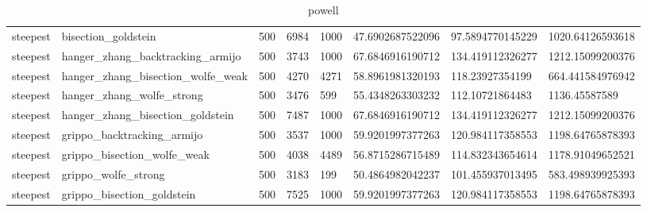 \documentclass[a4paper,11pt]{article}
\numberwithin{equation}{section} %
\begin{document}
\begin{table}[h!]
{\begin{tabular}{|l|l|l|l|l|l|l|l|}
        steepest & bisection\_goldstein & 500 & 6984 & 1000 & 47.6902687522096 & 97.5894770145229 & 1020.64126593618 \\
        steepest & hanger\_zhang\_backtracking\_armijo & 500 & 3743 & 1000 & 67.6846916190712 & 134.419112326277 & 1212.15099200376 \\
        steepest & hanger\_zhang\_bisection\_wolfe\_weak & 500 & 4270 & 4271 & 58.8961981320193 & 118.23927354199 & 664.441584976942 \\
        steepest & hanger\_zhang\_wolfe\_strong & 500 & 3476 & 599 & 55.4348263303232 & 112.10721864483 & 1136.45587589 \\
        steepest & hanger\_zhang\_bisection\_goldstein & 500 & 7487 & 1000 & 67.6846916190712 & 134.419112326277 & 1212.15099200376 \\
        steepest & grippo\_backtracking\_armijo & 500 & 3537 & 1000 & 59.9201997377263 & 120.984117358553 & 1198.64765878393 \\
        steepest & grippo\_bisection\_wolfe\_weak & 500 & 4038 & 4489 & 56.8715286715489 & 114.832343654614 & 1178.91049652521 \\
        steepest & grippo\_wolfe\_strong & 500 & 3183 & 199 & 50.4864982042237 & 101.455937013495 & 583.498939925393 \\
        steepest & grippo\_bisection\_goldstein & 500 & 7525 & 1000 & 59.9201997377263 & 120.984117358553 & 1198.64765878393 \\
\end{tabular}}
\caption{powell}
\label{table:powell}
\end{table}
\end{document}
